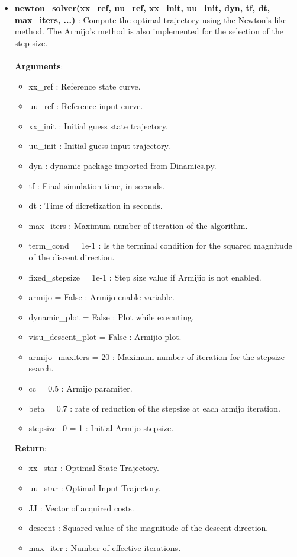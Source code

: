 \begin{itemize}
\item \textbf{newton\_solver(xx\_ref, uu\_ref, xx\_init, uu\_init, dyn, tf, dt, max\_iters, ...) }: Compute the optimal trajectory using the Newton's-like method. The Armijo's method is also implemented for the selection of the step size. \\\\
    \textbf{Arguments}:
    \begin{itemize}
        \item xx\_ref : Reference state curve.
        \item uu\_ref : Reference input curve.
        \item xx\_init : Initial guess state trajectory.
        \item uu\_init : Initial guess input trajectory.
        \item dyn : dynamic package imported from Dinamics.py.
        \item tf : Final simulation time, in seconds.
        \item dt : Time of dicretization in seconds.
        \item max\_iters : Maximum number of iteration of the algorithm.
        \item term\_cond = 1e-1 : Is the terminal condition for the squared magnitude of the discent direction.
        \item fixed\_stepsize = 1e-1 : Step size value if Armijio is not enabled.
        \item armijo = False : Armijo enable variable.
        \item dynamic\_plot = False : Plot while executing.
        \item visu\_descent\_plot = False : Armijio plot.
        \item armijo\_maxiters = 20 : Maximum number of iteration for the stepsize search.
        \item cc = 0.5 : Armijo paramiter.
        \item beta = 0.7 : rate of reduction of the stepsize at each armijo iteration.
        \item stepsize\_0 = 1 : Initial Armijo stepsize.
    \end{itemize}
    
    \textbf{Return}:
    \begin{itemize}
        \item xx\_star : Optimal State Trajectory.
        \item uu\_star : Optimal Input Trajectory.
        \item JJ : Vector of acquired costs.
        \item descent : Squared value of the magnitude of the descent direction.
        \item max\_iter : Number of effective iterations.
    \end{itemize}

\end{itemize}